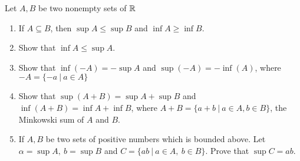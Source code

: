 Let $A,B$ be two nonempty sets of $\mathbb{R}$

\begin{enumerate}
	\item If $A \subseteq B$, then $\sup A \leq \sup B$ and $\inf A \geq \inf B$.
	\item Show that $\inf A \leq \sup A$.
	\item Show that $\inf (-A) = -\sup A$ and $\sup (-A) = -\inf (A)$, where $-A = \{-a ~|~ a \in A\}$
	\item Show that $\sup (A+B) = \sup A + \sup B$ and $\inf (A+B) = \inf A + \inf B$, where $A + B = \{a + b ~|~ a \in A,b \in B\}$, the Minkowski sum of $A$ and $B$.
	\item If $A,B$ be two sets of positive numbers which is bounded above. Let $\alpha = \sup A,~b = \sup B$ and $C = \{ab ~|~ a \in A ,~b \in B\}$. Prove that $\sup C = ab$.
\end{enumerate}

